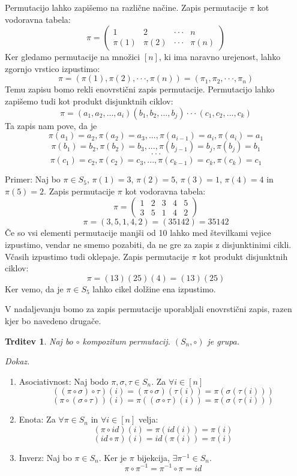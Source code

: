 \documentclass[a4paper, 12pt]{book}
\newtheorem{trditev}{Trditev}[chapter]
\newenvironment{dokaz}{\emph{Dokaz.}\ }{\hspace{\fill}{$\Box$}}
\begin{document}
Permutacijo lahko zapišemo na različne načine. 
Zapis permutacije $\pi$ kot vodoravna tabela:
\[
    \pi = \begin{pmatrix}
        1 & 2 & \cdot\cdot\cdot & n \\
        \pi(1) & \pi(2) & \cdot\cdot\cdot & \pi(n)
    \end{pmatrix}
\]
Ker gledamo permutacije na množici $[n]$, ki ima naravno urejenost, lahko zgornjo vrstico izpustimo:
\[
    \pi = (\pi(1), \pi(2), \cdot\cdot\cdot, \pi(n)) = (\pi_1, \pi_2, \cdot\cdot\cdot, \pi_n)
\]
Temu zapisu bomo rekli enovrstični zapis permutacije.
Permutacijo lahko zapišemo tudi kot produkt disjunktnih ciklov:
\[
    \pi = (a_1, a_2, ..., a_i)(b_1, b_2, ..., b_j) \cdot\cdot\cdot (c_1, c_2, ..., c_k)
\]
Ta zapis nam pove, da je 
\[ 
    \pi(a_1) = a_2, \pi(a_2) = a_3, ..., \pi(a_{i-1}) = a_i, \pi(a_i) = a_1
\]
\[
    \pi(b_1) = b_2, \pi(b_2) = b_3, ..., \pi(b_{j-1}) = b_j, \pi(b_j) = b_1    
\]
\[
    \cdot\cdot\cdot
\]
\[
    \pi(c_1) = c_2, \pi(c_2) = c_3, ..., \pi(c_{k-1}) = c_k, \pi(c_k) = c_1
\]

Primer: Naj bo $\pi \in S_5$, $\pi(1) = 3$, $\pi(2) = 5$, $\pi(3) = 1$, $\pi(4) = 4$ in $\pi(5) = 2$. Zapis permutacije $\pi$ kot vodoravna tabela:
\[
    \pi = \begin{pmatrix}
        1 & 2 & 3 & 4 & 5 \\
        3 & 5 & 1 & 4 & 2
    \end{pmatrix}
\]
\[
    \pi = (3, 5, 1, 4, 2) = (3 5 1 4 2) = 35142
\]
Če so vsi elementi permutacije manjši od 10 lahko med številkami vejice izpustimo, vendar ne smemo pozabiti, da ne gre za zapis z disjunktinimi cikli.
Včasih izpustimo tudi oklepaje.
Zapis permutacije $\pi$ kot produkt disjunktnih ciklov:
\[
    \pi = (1 3)(2 5)(4) = (1 3)(2 5)
\]
Ker vemo, da je $\pi \in S_5$ lahko cikel dolžine ena izpustimo.

V nadaljevanju bomo za zapis permutacije uporabljali enovrstični zapis, razen kjer bo navedeno drugače.

\begin{trditev}
    Naj bo $\circ$ kompozitum permutacij. $(S_n, \circ)$ je grupa.
\end{trditev}
\begin{dokaz}
    \begin{enumerate}
        \item Asociativnost: Naj bodo $\pi, \sigma, \tau \in S_n$. Za $\forall i \in [n]$ 
        \[
            ((\pi \circ \sigma) \circ \tau)(i) = (\pi \circ \sigma)(\tau(i)) = \pi(\sigma(\tau(i)))
        \]
        \[
            (\pi \circ (\sigma \circ \tau))(i) = \pi((\sigma \circ \tau)(i)) = \pi(\sigma(\tau(i))) 
        \]
        \item Enota: Za $\forall \pi \in S_n$ in $\forall i \in [n]$ velja:
        \[
            (\pi \circ id)(i) = \pi(id(i)) = \pi(i)
        \]
        \[
            (id \circ \pi)(i) = id(\pi(i)) = \pi(i)
        \]
        \item Inverz: Naj bo $\pi \in S_n$. Ker je $\pi$ bijekcija, $\exists \pi^{-1} \in S_n$.
        \[
            \pi \circ \pi^{-1} = \pi^{-1} \circ \pi = id
        \]
    \end{enumerate}
\end{dokaz}
\end{document}
